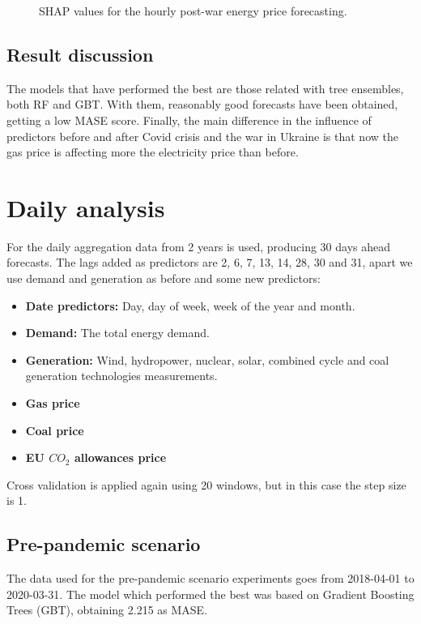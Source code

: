 \begin{figure}[H]
    \caption{SHAP values for the hourly post-war energy price forecasting.}
    \label{fig:shap-hourly-post}
\end{figure}


\subsection{Result discussion}
The models that have performed the best are those related with tree ensembles, both RF and GBT. With them, reasonably good forecasts have been obtained, getting a low MASE score. Finally, the main difference in the influence of predictors before and after Covid crisis and the war in Ukraine is that now the gas price is affecting more the electricity price than before.





\section{Daily analysis}
For the daily aggregation data from 2 years is used, producing 30 days ahead forecasts. The lags added as predictors are 2, 6, 7, 13, 14, 28, 30 and 31, apart we use demand and generation as before and some new predictors:

\begin{itemize}
    \item \textbf{Date predictors:} Day, day of week, week of the year and month.
    \item \textbf{Demand:} The total energy demand.
    \item \textbf{Generation:} Wind, hydropower, nuclear, solar, combined cycle and coal generation technologies measurements.
    \item \textbf{Gas price}
    \item \textbf{Coal price}
    \item \textbf{EU $CO_2$ allowances price}
\end{itemize}

\noindent Cross validation is applied again using 20 windows, but in this case the step size is 1.

\subsection{Pre-pandemic scenario}
The data used for the pre-pandemic scenario experiments goes from 2018-04-01 to 2020-03-31. The model which performed the best was based on Gradient Boosting Trees (GBT), obtaining 2.215 as MASE.

